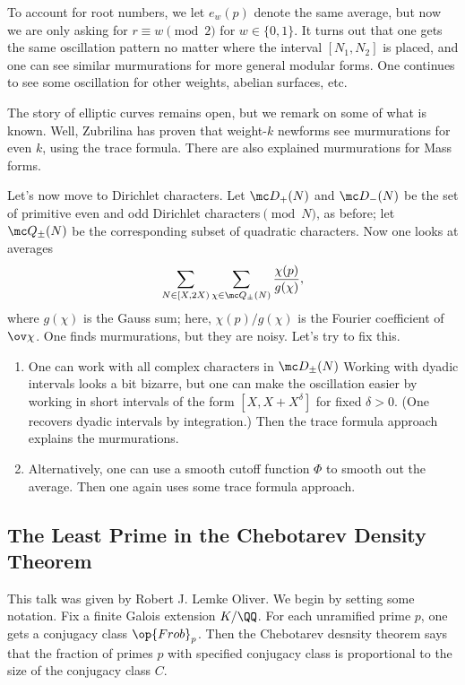 \documentclass{article}
\begin{document}
To account for root numbers, we let $e_w(p)$ denote the same average, but now we are only asking for $r\equiv w\pmod 2$ for $w\in\{0,1\}$. It turns out that one gets the same oscillation pattern no matter where the interval $[N_1,N_2]$ is placed, and one can see similar murmurations for more general modular forms. One continues to see some oscillation for other weights, abelian surfaces, etc.
\begin{remark}
	The story of elliptic curves remains open, but we remark on some of what is known. Well, Zubrilina has proven that weight-$k$ newforms see murmurations for even $k$, using the trace formula. There are also explained murmurations for Mass forms.
\end{remark}
Let's now move to Dirichlet characters. Let $\mc D_+(N)$ and $\mc D_-(N)$ be the set of primitive even and odd Dirichlet characters$\pmod N$, as before; let $\mc Q_{\pm}(N)$ be the corresponding subset of quadratic characters. Now one looks at averages
\[\sum_{N\in[X,2X)}\sum_{\chi\in\mc Q_{\pm}(N)}\frac{\chi(p)}{g(\chi)},\]
where $g(\chi)$ is the Gauss sum; here, $\chi(p)/g(\chi)$ is the Fourier coefficient of $\ov\chi$. One finds murmurations, but they are noisy. Let's try to fix this.
\begin{enumerate}
	\item One can work with all complex characters in $\mc D_{\pm}(N)$ Working with dyadic intervals looks a bit bizarre, but one can make the oscillation easier by working in short intervals of the form $\left[X,X+X^\delta\right]$ for fixed $\delta>0$. (One recovers dyadic intervals by integration.) Then the trace formula approach explains the murmurations.
	\item Alternatively, one can use a smooth cutoff function $\Phi$ to smooth out the average. Then one again uses some trace formula approach.
\end{enumerate}

\subsection{The Least Prime in the Chebotarev Density Theorem}
This talk was given by Robert J. Lemke Oliver. We begin by setting some notation. Fix a finite Galois extension $K/\QQ$. For each unramified prime $p$, one gets a conjugacy class $\op{Frob}_p$. Then the Chebotarev desnsity theorem says that the fraction of primes $p$ with specified conjugacy class is proportional to the size of the conjugacy class $C$.
\end{document}
